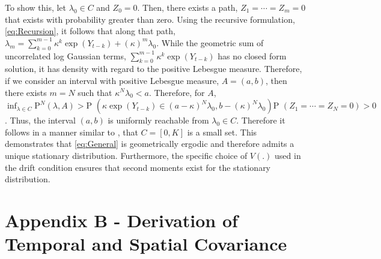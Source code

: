 \documentclass[11pt]{isuthesis}
\begin{document}
To show this, let $\lambda_0 \in C$ and $Z_0=0$.  Then, there exists a path, $Z_1=\cdots=Z_m=0$ that exists with probability greater than zero.  Using the recursive formulation, \eqref{eq:Recursion}, it follows that along that path, $\lambda_m=\sum_{k=0}^{m-1}\kappa^k\exp(Y_{t-k})+(\kappa)^m \lambda_0$.  While the geometric sum of uncorrelated log Gaussian terms, $\sum_{k=0}^{m-1}\kappa^k\exp(Y_{t-k})$ has no closed form solution, it has density with regard to the positive Lebesgue measure.  Therefore, if we consider an interval with positive Lebesgue measure, $A=(a,b)$, then there exists $m=N$ such that $\kappa^N \lambda_0<a$.  Therefore, for $A$, $\inf_{\lambda\in C}  \mbox{P}^N(\lambda,A) > \mbox{P }(\kappa\exp(Y_{t-k}) \in (a-\kappa)^N \lambda_0,b-(\kappa)^N \lambda_0)\mbox{P }(Z_1=\cdots=Z_N=0)>0$.  Thus, the interval $(a,b)$ is uniformly reachable from $\lambda_0 \in C$.  Therefore it follows in a manner similar to \cite{fokianos2009poisson}, that $C=[0,K]$ is a small set.  This demonstrates that \eqref{eq:General} is geometrically ergodic and therefore admits a unique stationary distribution.  Furthermore, the specific choice of $V(.)$ used in the drift condition ensures that second moments exist for the stationary distribution.

\section*{Appendix B - Derivation of Temporal and Spatial Covariance}
\end{document}
